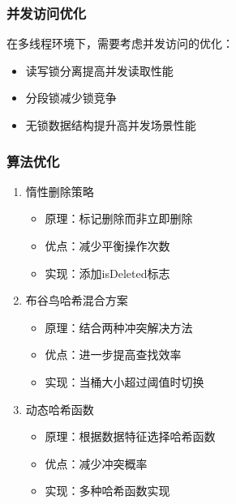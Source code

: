 \documentclass[12pt,a4paper]{article}
\begin{document}
\subsubsection{并发访问优化}
在多线程环境下，需要考虑并发访问的优化：
\begin{itemize}
\item 读写锁分离提高并发读取性能
\item 分段锁减少锁竞争
\item 无锁数据结构提升高并发场景性能
\end{itemize}

\subsubsection{算法优化}
\begin{enumerate}
\item 惰性删除策略
\begin{itemize}
\item 原理：标记删除而非立即删除
\item 优点：减少平衡操作次数
\item 实现：添加isDeleted标志
\end{itemize}

\item 布谷鸟哈希混合方案
\begin{itemize}
\item 原理：结合两种冲突解决方法
\item 优点：进一步提高查找效率
\item 实现：当桶大小超过阈值时切换
\end{itemize}

\item 动态哈希函数
\begin{itemize}
\item 原理：根据数据特征选择哈希函数
\item 优点：减少冲突概率
\item 实现：多种哈希函数实现
\end{itemize}
\end{enumerate}
\end{document}
